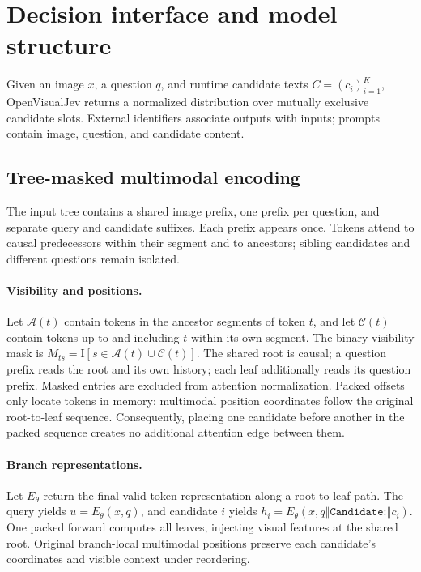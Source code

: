 \section{Decision interface and model structure}

Given an image $x$, a question $q$, and runtime candidate texts $C=(c_i)_{i=1}^{K}$, OpenVisualJev returns a normalized distribution over mutually exclusive candidate slots. External identifiers associate outputs with inputs; prompts contain image, question, and candidate content.

\subsection{Tree-masked multimodal encoding}
The input tree contains a shared image prefix, one prefix per question, and separate query and candidate suffixes. Each prefix appears once. Tokens attend to causal predecessors within their segment and to ancestors; sibling candidates and different questions remain isolated.

\paragraph{Visibility and positions.}
Let $\mathcal A(t)$ contain tokens in the ancestor segments of token $t$, and let $\mathcal C(t)$ contain tokens up to and including $t$ within its own segment. The binary visibility mask is $M_{ts}=\mathrm{I}[s\in\mathcal A(t)\cup\mathcal C(t)]$.
The shared root is causal; a question prefix reads the root and its own history; each leaf additionally reads its question prefix. Masked entries are excluded from attention normalization. Packed offsets only locate tokens in memory: multimodal position coordinates follow the original root-to-leaf sequence. Consequently, placing one candidate before another in the packed sequence creates no additional attention edge between them.

\paragraph{Branch representations.}
Let $E_\theta$ return the final valid-token representation along a root-to-leaf path. The query yields $u=E_\theta(x,q)$, and candidate $i$ yields $h_i=E_\theta(x,q\mathbin{\Vert}\texttt{Candidate:}\mathbin{\Vert}c_i)$. One packed forward computes all leaves, injecting visual features at the shared root. Original branch-local multimodal positions preserve each candidate's coordinates and visible context under reordering.


